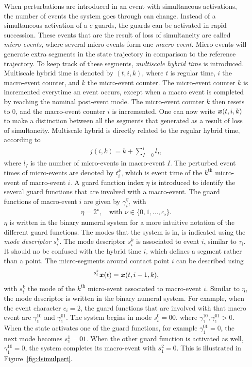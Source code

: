 \documentclass[../DC2017114Bouma.tex]{subfiles}
\begin{document}
When perturbations are introduced in an event with simultaneous activations, the number of events the system goes through can change. Instead of a simultaneous activation of a $c$ guards, the guards can be activated in rapid succession. These events that are the result of loss of simultaneity are called \textit{micro-events}, where several micro-events form one \textit{macro event}. Micro-events will generate extra segments in the state trajectory in comparison to the reference trajectory. To keep track of these segments, \textit{multiscale hybrid time} is introduced. Multiscale hybrid time is denoted by $(t,i,k)$, where $t$ is regular time, $i$ the macro-event counter, and $k$ the micro-event counter. The micro-event counter $k$ is incremented everytime an event occurs, except when a macro event is completed by reaching the nominal post-event mode. The micro-event counter $k$ then resets to $0$, and the macro-event counter $i$ is incremented. One can now write ${\boldsymbol{x}}(t,i,k)$ to make a distinction between all the segments that generated as a result of loss of simultaneity. Multiscale hybrid is directly related to the regular hybrid time, according to
\begin{align}
j(i,k) = k + \sum_{I=0}^{i}l_I,
\end{align}
where $l_I$ is the number of micro-events in macro-event $I$. The perturbed event times of micro-events are denoted by $t^k_i$, which is event time of the $k^{\text{th}}$ micro-event of macro-event $i$. A guard function index $\eta$ is introduced to identify the several guard functions that are involved with a macro-event. The guard functions of macro-event $i$ are given by $\gamma^{\eta}_i$, with
\begin{align}
\eta = 2^{\nu},\quad\text{with }\nu\in\{0,1,...,c_i\}.
\end{align}
$\eta$ is written in the binary numeral system for a more intuitive notation of the different guard functions. The modes that the system is in, is indicated using the \textit{mode descriptor} $s^k_i$. The mode descriptor $s^k_i$ is associated to event $i$, similar to $\tau_i$. It should no be confused with the hybrid time $i$, which defines a segment rather than a point. The micro-segments around contact point $i$ can be described using
\begin{align}
\hspace{0cm}^{s^k_i}{\boldsymbol{x}}(t) = {\boldsymbol{x}}(t,i-1,k),
\end{align}
with $s^k_i$ the mode of the $k^{\text{th}}$ micro-event associated to macro-event $i$. Similar to $\eta$, the mode descriptor is written in the binary numeral system. For example, when the event character $c_i = 2$, the guard functions that are involved with that macro event are $\gamma_1^{10}$ and $\gamma_1^{01}$. The system begins in mode $s_i^0 = 00$, where $\gamma_1^{10},\gamma_1^{01}>0$. When the state activates one of the guard functions, for example $\gamma_1^{01}=0$, the next mode becomes $s_1^1 = 01$. When the other guard function is activated as well, $\gamma_1^{10} = 0$, the system completes its macro-event with $s_1^2 = 0$. This is illustrated in Figure~\ref{fig:4simulpert}.
\end{document}
